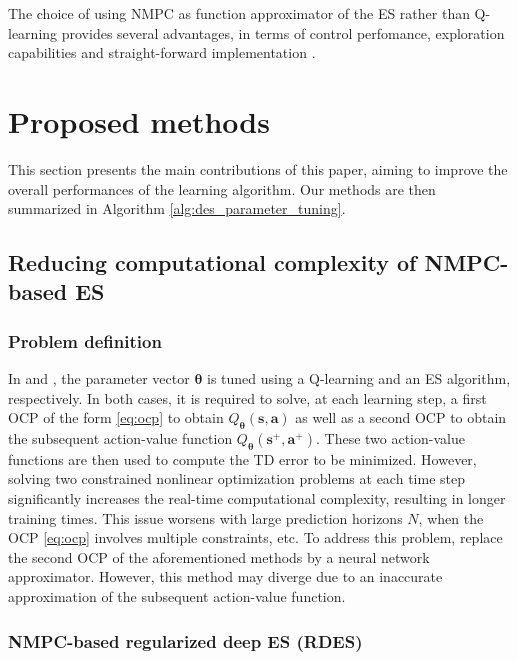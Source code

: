 \documentclass[letterpaper, 10pt, conference]{ieeeconf}
\begin{document}
The choice of using NMPC as function approximator of the ES rather than Q-learning provides several advantages, in terms of control perfomance, exploration capabilities and straight-forward implementation \cite{moradimaryamnegari2022model}.

\section{Proposed methods}
	\label{section:learning_nmpc}

This section presents the main contributions of this paper, aiming to improve the overall performances of the learning algorithm.
Our methods are then summarized in Algorithm \ref{alg:des_parameter_tuning}.

	\subsection{Reducing computational complexity of NMPC-based ES}
		\label{subsection:regularized_deep_expected_sarsa}

		\subsubsection{\textbf{Problem definition}}

In \cite{gros2019data} and \cite{moradimaryamnegari2022model}, the parameter vector $\boldsymbol{\theta}$ is tuned using a Q-learning and an ES algorithm, respectively.
In both cases, it is required to solve, at each learning step, a first OCP of the form \eqref{eq:ocp} to obtain $Q_{\boldsymbol{\theta}}(\mathbf{s}, \mathbf{a})$ as well as a second OCP to obtain the subsequent action-value function $Q_{\boldsymbol{\theta}}\left(\mathbf{s}^+, \mathbf{a}^+\right)$.
These two action-value functions are then used to compute the TD error to be minimized.
However, solving two constrained nonlinear optimization problems at each time step significantly increases the real-time computational complexity, resulting in longer training times. 
This issue worsens with large prediction horizons $N$, when the OCP \eqref{eq:ocp} involves multiple constraints, etc.
To address this problem, \cite{moradimaryamnegari2023data} replace the second OCP of the aforementioned methods by a neural network approximator.
However, this method may diverge due to an inaccurate approximation of the subsequent action-value function.

		\subsubsection{\textbf{NMPC-based regularized deep ES (RDES)}}
\end{document}
